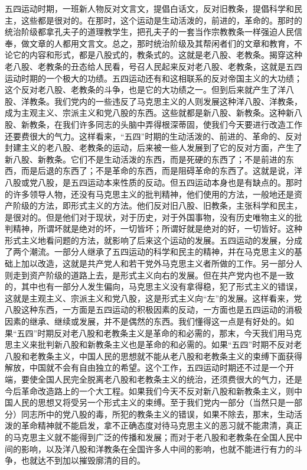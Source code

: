 五四运动时期，一班新人物反对文言文，提倡白话文，反对旧教条，提倡科学和民主，这些都是很对的。在那时，这个运动是生动活泼的，前进的，革命的。那时的统治阶级都拿孔夫子的道理教学生，把孔夫子的一套当作宗教教条一样强迫人民信奉，做文章的人都用文言文。总之，那时统治阶级及其帮闲者们的文章和教育，不论它的内容和形式，都是八股式的，教条式的。这就是老八股、老教条。揭穿这种老八股、老教条的丑态给人民看，号召人民起来反对老八股、老教条，这就是五四运动时期的一个极大的功绩。五四运动还有和这相联系的反对帝国主义的大功绩；这个反对老八股、老教条的斗争，也是它的大功绩之一。但到后来就产生了洋八股、洋教条。我们党内的一些违反了马克思主义的人则发展这种洋八股、洋教条，成为主观主义、宗派主义和党八股的东西。这些就都是新八股、新教条。这种新八股、新教条，在我们许多同志的头脑中弄得根深蒂固，使我们今天要进行改造工作还要费很大的气力。这样看来，“五四”时期的生动活泼的、前进的、革命的、反对封建主义的老八股、老教条的运动，后来被一些人发展到了它的反对方面，产生了新八股、新教条。它们不是生动活泼的东西，而是死硬的东西了；不是前进的东西，而是后退的东西了；不是革命的东西，而是阻碍革命的东西了。这就是说，洋八股或党八股，是五四运动本来性质的反动。但五四运动本身也是有缺点的。那时的许多领导人物，还没有马克思主义的批判精神，他们使用的方法，一般地还是资产阶级的方法，即形式主义的方法。他们反对旧八股、旧教条，主张科学和民主，是很对的。但是他们对于现状，对于历史，对于外国事物，没有历史唯物主义的批判精神，所谓坏就是绝对的坏，一切皆坏；所谓好就是绝对的好，一切皆好。这种形式主义地看问题的方法，就影响了后来这个运动的发展。五四运动的发展，分成了两个潮流。一部分人继承了五四运动的科学和民主的精神，并在马克思主义的基础上加以改造，这就是共产党人和若干党外马克思主义者所做的工作。另一部分人则走到资产阶级的道路上去，是形式主义向右的发展。但在共产党内也不是一致的，其中也有一部分人发生偏向，马克思主义没有拿得稳，犯了形式主义的错误，这就是主观主义、宗派主义和党八股，这是形式主义向“左”的发展。这样看来，党八股这种东西，一方面是五四运动的积极因素的反动，一方面也是五四运动的消极因素的继承、继续或发展，并不是偶然的东西。我们懂得这一点是有好处的。如果“五四”时期反对老八股和老教条主义是革命的和必需的，那末，今天我们用马克思主义来批判新八股和新教条主义也是革命的和必需的。如果“五四”时期不反对老八股和老教条主义，中国人民的思想就不能从老八股和老教条主义的束缚下面获得解放，中国就不会有自由独立的希望。这个工作，五四运动时期还不过是一个开端，要使全国人民完全脱离老八股和老教条主义的统治，还须费很大的气力，还是今后革命改造路上的一个大工程。如果我们今天不反对新八股和新教条主义，则中国人民的思想又将受另一个形式主义的束缚。至于我们党内一部分（当然只是一部分）同志所中的党八股的毒，所犯的教条主义的错误，如果不除去，那末，生动活泼的革命精神就不能启发，拿不正确态度对待马克思主义的恶习就不能肃清，真正的马克思主义就不能得到广泛的传播和发展；而对于老八股和老教条在全国人民中间的影响，以及洋八股和洋教条在全国许多人中间的影响，也就不能进行有力的斗争，也就达不到加以摧毁廓清的目的。

